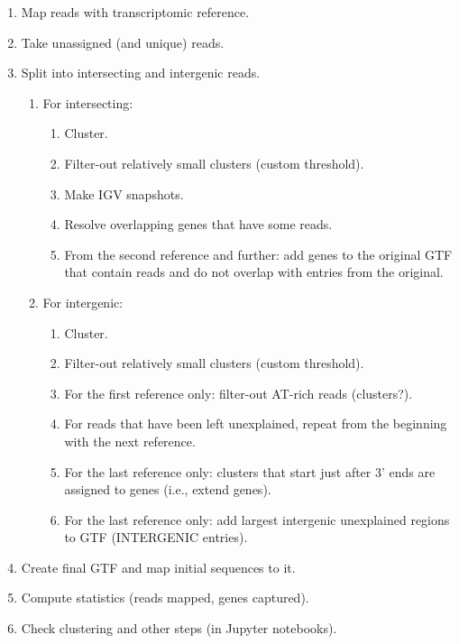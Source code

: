 \begin{enumerate}
    \item Map reads with transcriptomic reference.
    \item Take unassigned (and unique) reads.
    \item Split into intersecting and intergenic reads.
    \begin{enumerate}
        \item For intersecting:
        \begin{enumerate}
            \item Cluster.
            \item Filter-out relatively small clusters (custom threshold).
            \item Make IGV snapshots.
            \item Resolve overlapping genes that have some reads.
            \item From the second reference and further: add genes to the original GTF that contain reads and do not overlap with entries from the original.
        \end{enumerate}
        \item For intergenic:
        \begin{enumerate}
            \item Cluster.
            \item Filter-out relatively small clusters (custom threshold).
            \item For the first reference only: filter-out AT-rich reads (clusters?).
            \item For reads that have been left unexplained, repeat from the beginning with the next reference.
            \item For the last reference only: clusters that start just after 3' ends are assigned to genes (i.e., extend genes).
            \item For the last reference only: add largest intergenic unexplained regions to GTF (INTERGENIC entries).
        \end{enumerate}
    \end{enumerate}
    \item Create final GTF and map initial sequences to it.
    \item Compute statistics (reads mapped, genes captured).
    \item Check clustering and other steps (in Jupyter notebooks).
\end{enumerate}
